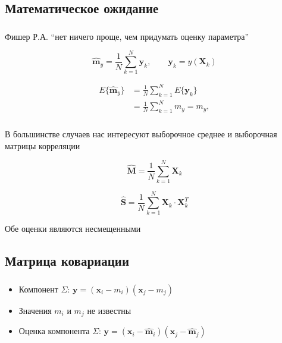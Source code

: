 \documentclass{beamer}
\begin{document}



\subsection{Математическое ожидание}

\begin{frame}
  \frametitle{\insertsection}
  \framesubtitle{\insertsubsection}
    Фишер Р.А.
  ``нет ничего проще, чем придумать оценку параметра'' \pause

  \begin{equation*}
   \displaystyle \mathbf{\widehat{m}}_y = \frac{1}{N} \sum_{k = 1}^{N} \mathbf{y}_k, \qquad \mathbf{y}_k = y(\mathbf{X}_k)
  \end{equation*} \pause

  \begin{align*}
    E\{\mathbf{\widehat{m}}_y\}
    &= \frac{1}{N} \sum_{k = 1}^{N} E\{ \mathbf{y}_k \} \\
    &= \frac{1}{N} \sum_{k = 1}^{N} m_y = m_y,
  \end{align*}

\end{frame}


\begin{frame}
  \frametitle{\insertsection}
  В большинстве случаев нас интересуют выборочное среднее и выборочная матрицы корреляции

  \begin{equation*}
    \mathbf{\widehat{M}} = \frac{1}{N} \sum_{k = 1}^{N} \mathbf{X}_k
  \end{equation*}

  \begin{equation*}
    \mathbf{\widehat{S}} = \frac{1}{N} \sum_{k = 1}^{N} \mathbf{X}_k \cdot \mathbf{X}_k^T
  \end{equation*}

  Обе оценки являются \alert{несмещенными}

\end{frame}

\subsection{Матрица ковариации}

\begin{frame}
  \frametitle{\insertsection}
  \framesubtitle{\insertsubsection}

  \begin{itemize}
  \item Компонент $\Sigma$: $\mathbf{y} = (\mathbf{x}_i - m_i)(\mathbf{x}_j - m_j)$ \pause
  \item Значения $m_i$ и $m_j$ не известны \pause
  \item Оценка компонента $\Sigma$: $\mathbf{y} = (\mathbf{x}_i - \mathbf{\widehat{m}}_i)(\mathbf{x}_j - \mathbf{\widehat{m}}_j)$
  \end{itemize}

\end{frame}
\end{document}
